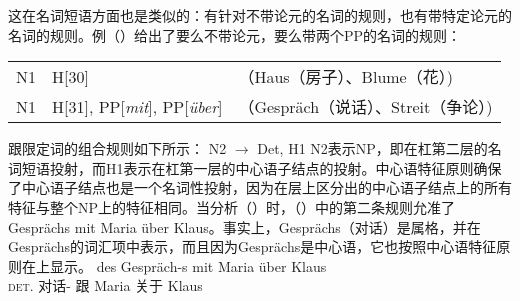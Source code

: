 这在名词短语方面也是类似的：有针对不带论元的名词的规则，也有带特定论元的名词的规则。例（）给出了要么不带论元，要么带两个PP的名词的规则\citep*[]{GKPS85a}：
\ea
\begin{tabular}[t]{@{}l@{~$\to$~}ll@{}}
N1 & H[30] &（Haus（房子）、Blume（花）)\\
N1 & H[31], PP[\emph{mit}], PP[\emph{über}] &（Gespräch（说话）、Streit（争论）)\\
\end{tabular}
\z
\nbarc 跟限定词的组合规则如下所示：
\ea
N2 $\to$ Det, H1
\z
N2表示NP，即在杠第二层的名词短语投射，而H1表示在杠第一层的中心语子结点的投射。中心语特征原则确保了中心语子结点也是一个名词性投射，因为在\xbarc 层上区分出的中心语子结点上的所有特征与整个NP上的特征相同。当分析（）时，（）中的第二条规则允准了\nbarc Gesprächs mit Maria über Klaus。事实上，Gesprächs（对话）是属格，并在Gesprächs的词汇项中表示，而且因为Gesprächs是中心语，它也按照中心语特征原则在\nbarc 上显示。
\ea
\gll des Gespräch-s mit Maria über Klaus\\
	 \textsc{det}.\gen{} 对话-\gen{} 跟 Maria 关于 Klaus\\
